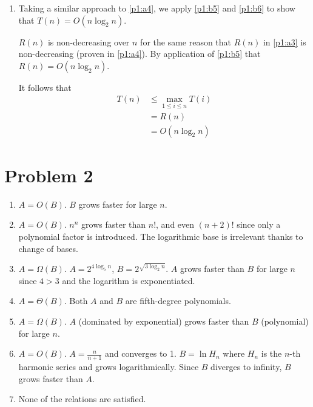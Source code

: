 \documentclass[12pt,a4paper]{article}
\begin{document}
\begin{enumerate}[label=(\alph*)]
\begin{enumerate}[label=(\roman*)]
				\item
				Taking a similar approach to \ref{p1:a4}, we apply \ref{p1:b5} and \ref{p1:b6} to show that $T(n) = O(n \log_2 n)$.
				
				$R(n)$ is non-decreasing over $n$ for the same reason that $R(n)$ in \ref{p1:a3} is non-decreasing (proven in \ref{p1:a4}). By application of \ref{p1:b5} that $R(n) = O(n \log_2 n)$.

				It follows that
				\begin{align*}
					T(n) &\le \max_{1 \le i \le n} T(i) \\
					&= R(n) \\
					&= O(n \log_2 n)
				\end{align*}
			\end{enumerate}
		\end{enumerate}

	\newpage
	\section*{Problem 2}
		\begin{enumerate}[label=(\alph*)]
			\item $A = O(B)$. $B$ grows faster for large $n$.
			\item $A = O(B)$. $n^n$ grows faster than $n!$, and even $(n+2)!$ since only a polynomial factor is introduced. The logarithmic base is irrelevant thanks to change of bases.
			\item $A = \Omega(B)$. $A = 2^{4\log_5 n}$, $B = 2^{\sqrt{3 \log_2 n}}$. $A$ grows faster than $B$ for large $n$ since $4 > 3$ and the logarithm is exponentiated.
			\item $A = \Theta(B)$. Both $A$ and $B$ are fifth-degree polynomials.
			\item $A = \Omega(B)$. $A$ (dominated by exponential) grows faster than $B$ (polynomial) for large $n$.
			\item $A = O(B)$. $A = \frac{n}{n+1}$ and converges to 1. $B = \ln H_n$ where $H_n$ is the $n$-th harmonic series and grows logarithmically. Since $B$ diverges to infinity, $B$ grows faster than $A$.
			\item None of the relations are satisfied.
		\end{enumerate}

	\newpage
\end{document}
